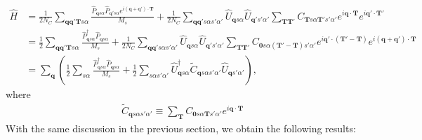 \documentclass{article}
\begin{document}
\begin{align}
    \hat{H} &= \frac{1}{2 N_C}\sum_{\textbf{q}\textbf{q}'\textbf{T}s\alpha}
    \frac{\hat{P}_{\textbf{q}s\alpha}\hat{P}_{\textbf{q}'s\alpha} e^{i(\textbf{q}+\textbf{q}')\cdot\textbf{T}}}{M_s} 
    + \frac{1}{2 N_C}\sum_{\textbf{q}\textbf{q}'s\alpha s'\alpha'}
    \hat{U}_{\textbf{q}s\alpha}  \hat{U}_{\textbf{q}'s'\alpha'}
    \sum_{\textbf{T} \textbf{T}'}
    C_{\textbf{T}s\alpha \textbf{T}'s'\alpha'}
    e^{i\textbf{q}\cdot\textbf{T}}e^{i\textbf{q}'\cdot\textbf{T}'}
    \nonumber \\
    &=
    \frac{1}{2}\sum_{\textbf{q}\textbf{q}'\textbf{T}s\alpha}
    \frac{\hat{P}_{\textbf{q}s\alpha}^\dagger \hat{P}_{\textbf{q}s\alpha}}{M_s} 
    + \frac{1}{2 N_C}\sum_{\textbf{q}\textbf{q}'s\alpha s'\alpha'}
    \hat{U}_{\textbf{q}s\alpha}  \hat{U}_{\textbf{q}'s'\alpha'}
    \sum_{\textbf{T} \textbf{T}'}
    C_{\textbf{0}s\alpha (\textbf{T}'-\textbf{T})s'\alpha'}
    e^{i\textbf{q}'\cdot(\textbf{T}'-\textbf{T})}e^{i(\textbf{q}+\textbf{q}')\cdot\textbf{T}}
    \nonumber \\
    &=
    \sum_{\textbf{q}} \left(
    \frac{1}{2}\sum_{s\alpha}
    \frac{\hat{P}_{\textbf{q}s\alpha}^\dagger \hat{P}_{\textbf{q}s\alpha}}{M_s} 
    + \frac{1}{2}\sum_{s\alpha s'\alpha'}
    \hat{U}_{\textbf{q}s\alpha}^\dagger \tilde{C}_{\textbf{q}s\alpha s'\alpha'} \hat{U}_{\textbf{q}s'\alpha'}
    \right),
\end{align}
where
\begin{align}
    \tilde{C}_{\textbf{q}s\alpha s'\alpha'} \equiv
    \sum_{\textbf{T}}
    C_{\textbf{0}s\alpha \textbf{T}s'\alpha'}
    e^{i\textbf{q}\cdot\textbf{T}}
\end{align}
With the same discussion in the previous section, we obtain the following results:
\end{document}
